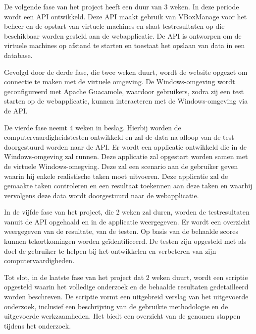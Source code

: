 De volgende fase van het project heeft een duur van 3 weken. In deze periode wordt een API ontwikkeld. Deze API maakt gebruik van VBoxManage voor het beheer en de opstart van virtuele machines en slaat testresultaten op die beschikbaar worden gesteld aan de webapplicatie. De API is ontworpen om de virtuele machines op afstand te starten en toestaat het opslaan van data in een database.

Gevolgd door de derde fase, die twee weken duurt, wordt de website opgezet om connectie te maken met de virtuele omgeving. De Windows-omgeving wordt geconfigureerd met Apache Guacamole, waardoor gebruikers, zodra zij een test starten op de webapplicatie, kunnen interacteren met de Windows-omgeving via de API.

De vierde fase neemt 4 weken in beslag. Hierbij worden de computervaardigheidstesten ontwikkeld en zal de data na afloop van de test doorgestuurd worden naar de API. Er wordt een applicatie ontwikkeld die in de Windows-omgeving zal runnen. Deze applicatie zal opgestart worden samen met de virtuele Windows-omegving. Deze zal een scenario aan de gebruiker geven waarin hij enkele realistische taken moet uitvoeren. Deze applicatie zal de gemaakte taken controleren en een resultaat toekennen aan deze taken en waarbij vervolgens deze data wordt doorgestuurd naar de webapplicatie.

In de vijfde fase van het project, die 2 weken zal duren, worden de testresultaten vanuit de API opgehaald en in de applicatie weergegeven. Er wordt een overzicht weergegeven van de resultate, van de testen. Op basis van de behaalde scores kunnen tekortkomingen worden geïdentificeerd. De testen zijn opgesteld met als doel de gebruiker te helpen bij het ontwikkelen en verbeteren van zijn computervaardigheden.

Tot slot, in de laatste fase van het project dat 2 weken duurt, wordt een scriptie opgesteld waarin het volledige onderzoek en de behaalde resultaten gedetailleerd worden beschreven. De scriptie vormt een uitgebreid verslag van het uitgevoerde onderzoek, inclusief een beschrijving van de gebruikte methodologie en de uitgevoerde werkzaamheden. Het biedt een overzicht van de genomen stappen tijdens het onderzoek.



